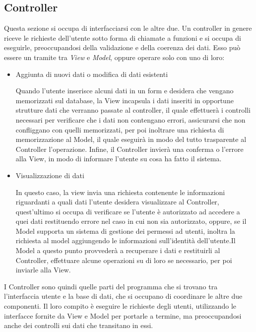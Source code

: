 \subsection{Controller}
Questa sezione si occupa di interfacciarsi con le altre due. Un controller in genere riceve le richieste dell'utente sotto forma di chiamate a funzioni e si occupa di eseguirle, preoccupandosi della validazione e della coerenza dei dati. Esso può essere un tramite tra \emph{View} e \emph{Model}, oppure operare solo con uno di loro:
\begin{itemize}
	\item Aggiunta di nuovi dati o modifica di dati esistenti
	
	Quando l'utente inserisce alcuni dati in un form e desidera che vengano memorizzati sul database, la View incapsula i dati inseriti in opportune strutture dati che verranno passate al controller, il quale effettuerà i controlli necessari per verificare che i dati non contengano errori, assicurarsi che non confliggano con quelli memorizzati, per poi inoltrare una richiesta di memorizzazione al Model, il quale eseguirà in modo del tutto trasparente al Controller l'operazione. Infine, il Controller invierà una conferma o l'errore alla View, in modo di informare l'utente su cosa ha fatto il sistema.
	\item Visualizzazione di dati
	
	In questo caso, la view invia una richiesta contenente le informazioni riguardanti a quali dati l'utente desidera visualizzare al Controller, quest'ultimo si occupa di verificare se l'utente è autorizzato ad accedere a quei dati restituendo errore nel caso in cui non sia autorizzato, oppure, se il Model supporta un sistema di gestione dei permessi ad utenti, inoltra la richiesta al model aggiungendo le informazioni sull'identità dell'utente.Il Model a questo punto provvederà a recuperare i dati e restituirli al Controller, effettuare alcune operazioni su di loro se necessario, per poi inviarle alla View.
\end{itemize}

I Controller sono quindi quelle parti del programma che si trovano tra l'interfaccia utente e la base di dati, che si occupano di coordinare le altre due componenti. Il loro compito è eseguire le richieste degli utenti, utilizzando le interfacce fornite da View e Model per portarle a termine, ma preoccupandosi anche dei controlli sui dati che transitano in essi.


